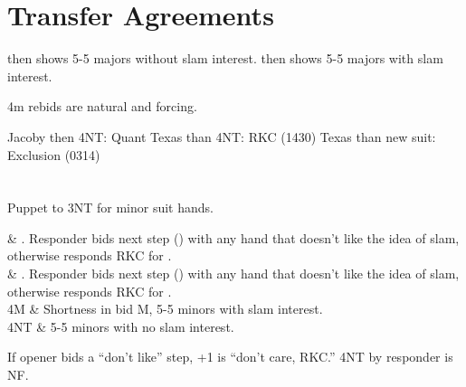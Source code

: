 \documentclass[tom-jenni]{subfile}
\begin{document}
\section{Transfer Agreements}

 then  shows 5-5 majors without slam interest.
 then  shows 5-5 majors with slam interest.

4m rebids are natural and forcing.

Jacoby then 4NT:  Quant
Texas than 4NT:  RKC (1430)
Texas than new suit: Exclusion (0314)

\section[3S]{}

Puppet to 3NT for minor suit hands.

\begin{bidtable}{}
	 & \ddd. Responder bids next step () with any hand that doesn't like the idea of slam, otherwise responds RKC for \ddd. \\
	 & \ccc. Responder bids next step () with any hand that doesn't like the idea of slam, otherwise responds RKC for \ccc. \\
	4M & Shortness in bid M, 5-5 minors with slam interest. \\
	4NT & 5-5 minors with no slam interest. \\
\end{bidtable}

If opener bids a ``don't like'' step, +1 is ``don't care, RKC.'' 4NT by responder is NF.
\end{document}
